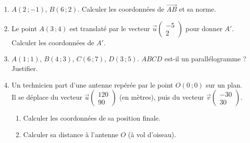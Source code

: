 \begin{enumerate}[label=\arabic*)]
\item $A(2\,;-1)$, $B(6\,;2)$. Calculer les coordonnées de $\vec{AB}$ et sa norme.
\item Le point $A(3\,;4)$ est translaté par le vecteur $\vec u\begin{pmatrix}-5\\2\end{pmatrix}$
pour donner $A'$. Calculer les coordonnées de $A'$.
\item $A(1\,;1)$, $B(4\,;3)$, $C(6\,;7)$, $D(3\,;5)$. $ABCD$ est-il un parallélogramme ?
Justifier.
\item Un technicien part d'une antenne repérée par le point $O(0\,;0)$ sur un plan. Il se
déplace du vecteur $\vec u\begin{pmatrix}120\\90\end{pmatrix}$ (en mètres), puis du vecteur
$\vec v\begin{pmatrix}-30\\30\end{pmatrix}$.
\begin{enumerate}[label=\alph*)]
\item Calculer les coordonnées de sa position finale.
\item Calculer sa distance à l'antenne $O$ (à vol d'oiseau).
\end{enumerate}
\end{enumerate}

